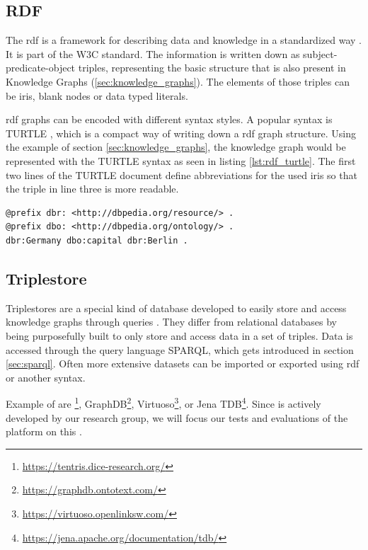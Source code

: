 \subsection{RDF}
\label{sec:rdf}
The \acf{rdf} is a framework for describing data and knowledge in a standardized way \cite{RDFConceptsAbstract}. 
It is part of the W3C standard.
The information is written down as subject-predicate-object triples, representing the basic structure that is also present in Knowledge Graphs (\ref{sec:knowledge_graphs}).
The elements of those triples can be \acp{iri}, blank nodes or data typed literals.

\ac{rdf} graphs can be encoded with different syntax styles.
A popular syntax is TURTLE \cite{RDFTurtle}, which is a compact way of writing down a \ac{rdf} graph structure.
Using the example of section \ref{sec:knowledge_graphs}, the knowledge graph would be represented with the TURTLE syntax as seen in listing \ref{lst:rdf_turtle}.
The first two lines of the TURTLE document define abbreviations for the used \acp{iri} so that the triple in line three is more readable.

\begin{lstlisting}[caption={RDF example in TURTLE syntax}, label=lst:rdf_turtle]
@prefix dbr: <http://dbpedia.org/resource/> .
@prefix dbo: <http://dbpedia.org/ontology/> .
dbr:Germany dbo:capital dbr:Berlin .
\end{lstlisting}


\subsection{Triplestore}
\label{sec:triplestores}
Triplestores are a special kind of database developed to easily store and access knowledge graphs through queries \cite{rusherTriplestoresHttpsWww}.
They differ from relational databases by being purposefully built to only store and access data in a set of triples.
Data is accessed through the query language SPARQL, which gets introduced in section \ref{sec:sparql}.
Often more extensive datasets can be imported or exported using \ac{rdf} or another syntax.

Example of \tsp{} are \tentris{}\footnote{\url{https://tentris.dice-research.org/}}, GraphDB\footnote{\url{https://graphdb.ontotext.com/}}, Virtuoso\footnote{\url{https://virtuoso.openlinksw.com/}}, or Jena TDB\footnote{\url{https://jena.apache.org/documentation/tdb/}}.
Since \tentris{} is actively developed by our research group, we will focus our tests and evaluations of the platform on this \ts{}.

